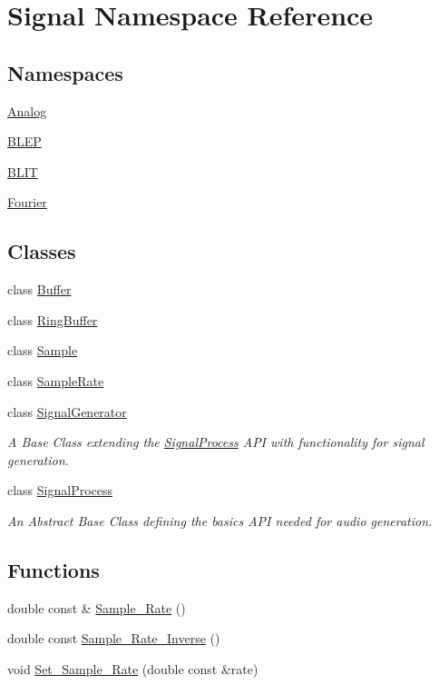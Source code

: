 \hypertarget{namespaceSignal}{\section{Signal Namespace Reference}
\label{namespaceSignal}
}
\subsection*{Namespaces}
\begin{DoxyCompactItemize}
\item 
 \hyperlink{namespaceSignal_1_1Analog}{Analog}
\item 
 \hyperlink{namespaceSignal_1_1BLEP}{B\+L\+E\+P}
\item 
 \hyperlink{namespaceSignal_1_1BLIT}{B\+L\+I\+T}
\item 
 \hyperlink{namespaceSignal_1_1Fourier}{Fourier}
\end{DoxyCompactItemize}
\subsection*{Classes}
\begin{DoxyCompactItemize}
\item 
class \hyperlink{classSignal_1_1Buffer}{Buffer}
\item 
class \hyperlink{classSignal_1_1RingBuffer}{Ring\+Buffer}
\item 
class \hyperlink{classSignal_1_1Sample}{Sample}
\item 
class \hyperlink{classSignal_1_1SampleRate}{Sample\+Rate}
\item 
class \hyperlink{classSignal_1_1SignalGenerator}{Signal\+Generator}
\begin{DoxyCompactList}\small\item\em A Base Class extending the \hyperlink{classSignal_1_1SignalProcess}{Signal\+Process} A\+P\+I with functionality for signal generation. \end{DoxyCompactList}\item 
class \hyperlink{classSignal_1_1SignalProcess}{Signal\+Process}
\begin{DoxyCompactList}\small\item\em An Abstract Base Class defining the basics A\+P\+I needed for audio generation. \end{DoxyCompactList}\end{DoxyCompactItemize}
\subsection*{Functions}
\begin{DoxyCompactItemize}
\item 
double const \& \hyperlink{namespaceSignal_ae7b1f222afc010e0f33f306f978fcde9}{Sample\+\_\+\+Rate} ()
\item 
double const \hyperlink{namespaceSignal_ae7e8bbfcac6571aaaf18d7f96f3fefc3}{Sample\+\_\+\+Rate\+\_\+\+Inverse} ()
\item 
void \hyperlink{namespaceSignal_a2f163a7bbf1b0fc76ceba8b0916a7890}{Set\+\_\+\+Sample\+\_\+\+Rate} (double const \&rate)
\end{DoxyCompactItemize}


